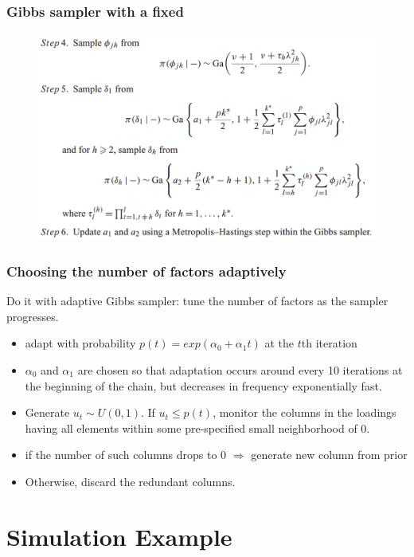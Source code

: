 \documentclass{beamer}
\begin{document}
	
	\begin{frame}
		\frametitle{Gibbs sampler with a fixed}
		\begin{figure}
			\includegraphics[width=0.9\linewidth]{image003.png}
		\end{figure}	
	\end{frame}
	
	\begin{frame}
		\frametitle{Choosing the number of factors adaptively}
		Do it with adaptive Gibbs sampler: tune the number of factors as the sampler progresses.
		\begin{itemize}
			\item 
			adapt with probability $p(t) = exp(\alpha_0 + \alpha_1 t)$ at the $t$th iteration
			\item
			$\alpha_0$ and $\alpha_1$ are chosen so that adaptation occurs around every 10 iterations at the beginning of the chain, but decreases in frequency exponentially fast.
			\item
			Generate $u_t \sim U(0,1)$. If $u_t \leq p(t)$, monitor the columns in the loadings having all elements within some pre-specified small neighborhood of 0.
			\item
			if the number of such columns drops to 0 $\Rightarrow$ generate new column from prior
			\item
			Otherwise, discard the redundant columns.
			
		\end{itemize}
	\end{frame}
	
	\section{Simulation Example}
	
\end{document}
